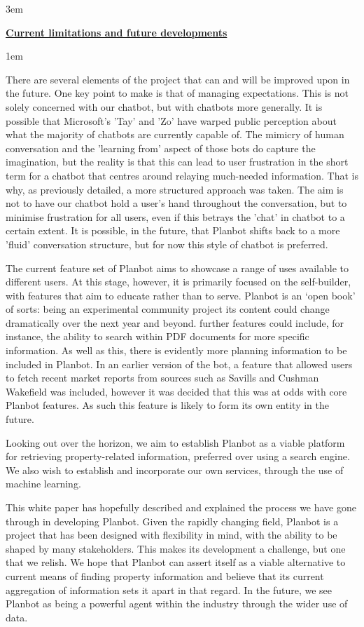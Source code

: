 \documentclass[12pt, a4paper]{article}
\begin{document}
    \parskip 3em

  {\large\bfseries\ul{Current limitations and future developments}}

    \parskip 1em

  There are several elements of the project that can and will be improved upon
  in the future. One key point to make is that of managing expectations. This
  is not solely concerned with our chatbot, but with chatbots more generally.
  It is possible that Microsoft's 'Tay' and 'Zo' have warped public perception
  about what the majority of chatbots are currently capable of. The mimicry of
  human conversation and the 'learning from' aspect of those bots do capture
  the imagination, but the reality is that this can lead to user frustration in
  the short term for a chatbot that centres around relaying much-needed
  information. That is why, as previously detailed, a more structured
  approach was taken. The aim is not to have our chatbot hold a user's hand
  throughout the conversation, but to minimise frustration for all users,
  even if this betrays the 'chat' in chatbot to a certain extent. It is
  possible, in the future, that Planbot shifts back to a more 'fluid'
  conversation structure, but for now this style of chatbot is preferred.

  The current feature set of Planbot aims to showcase a range of uses
  available to different users. At this stage, however, it is primarily focused
  on the self-builder, with features that aim to educate rather than to serve.
  Planbot is an `open book' of sorts: being an experimental community project
  its content could change dramatically over the next year and beyond. further
  features could include, for instance, the ability to search within PDF
  documents for more specific information. As well as this, there is evidently
  more planning information to be included in Planbot. In an earlier version
  of the bot, a feature that allowed users to fetch recent market reports from
  sources such as Savills and Cushman Wakefield was included, however it was
  decided that this was at odds with core Planbot features. As such this
  feature is likely to form its own entity in the future.

  Looking out over the horizon, we aim to establish Planbot as a viable
  platform for retrieving property-related information, preferred over using a
  search engine. We also wish to establish and incorporate our own services,
  through the use of machine learning.

  This white paper has hopefully described and explained the process we have
  gone through in developing Planbot. Given the rapidly changing field,
  Planbot is a project that has been designed with flexibility in mind,
  with the ability to be shaped by many stakeholders. This makes its
  development a challenge, but one that we relish. We hope that Planbot
  can assert itself as a viable alternative to current means of finding
  property information and believe that its current aggregation of
  information sets it apart in that regard. In the future, we see Planbot
  as being a powerful agent within the industry through the wider use of data.
\end{document}
